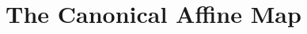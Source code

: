 \documentclass[12pt, oneside]{article}
\numberwithin{equation}{section}
\theoremstyle{definition}
\theoremstyle{plain}
\newtheorem{theorem}{Theorem}[section]
\newtheorem{corollary}[theorem]{Corollary}
\theoremstyle{remark}
\newtheorem*{remark}{Remark}
\begin{document}









\appendix

\newpage
\section{The Canonical Affine Map}
\label{app:canonical-c}
\end{document}
